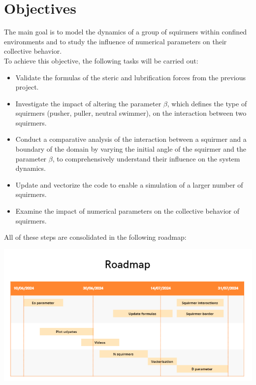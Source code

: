 \documentclass{article}
\begin{document}
\section{Objectives}
The main goal is to model the dynamics of a group of squirmers within confined environments and to
 study the influence of numerical parameters on their collective behavior.\\
 To achieve this objective, the following tasks will be carried out:
 \begin{itemize}
     \item Validate the formulas of the steric and lubrification forces from the previous project.
     \item Investigate the impact of altering the parameter $\beta$, which defines the
    type of squirmers (pusher, puller, neutral swimmer), on the interaction between two squirmers.
     \item Conduct a comparative analysis of the interaction between a squirmer and a 
    boundary of the domain by varying the initial angle of the squirmer and the parameter $\beta$, 
    to comprehensively understand their influence on the system dynamics.
     \item Update and vectorize the code to enable a simulation of a larger number of squirmers.
     \item Examine the impact of numerical parameters on the collective behavior of squirmers.
\end{itemize}
All of these steps are consolidated in the following roadmap:
\begin{center}
    \includegraphics[width=1\textwidth]{Presentation/images/roadmap_stage.png}
\end{center}

\newpage
\end{document}

